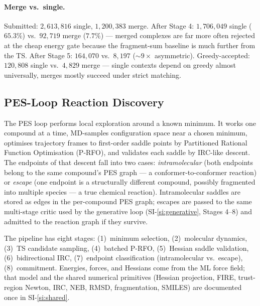 \paragraph{Merge vs.\ single.}
Submitted: $2{,}613{,}816$ single, $1{,}200{,}383$ merge. After Stage 4: $1{,}706{,}049$ single ($65.3\%$) vs.\ $92{,}719$ merge ($7.7\%$) --- merged complexes are far more often rejected at the cheap energy gate because the fragment-sum baseline is much further from the TS. After Stage 5: $164{,}070$ vs.\ $8{,}197$ ($\sim 9\times$ asymmetric). Greedy-accepted: $120{,}808$ single vs.\ $4{,}829$ merge --- single contexts depend on greedy almost universally, merges mostly succeed under strict matching.


%

\subsection{PES-Loop Reaction Discovery}
\label{si:pes}

The PES loop performs local exploration around a known minimum. It works one compound at a time, MD-samples configuration space near a chosen minimum, optimises trajectory frames to first-order saddle points by Partitioned Rational Function Optimisation (P-RFO), and validates each saddle by IRC-like descent. The endpoints of that descent fall into two cases: \emph{intramolecular} (both endpoints belong to the same compound's PES graph --- a conformer-to-conformer reaction) or \emph{escape} (one endpoint is a structurally different compound, possibly fragmented into multiple species --- a true chemical reaction). Intramolecular saddles are stored as edges in the per-compound PES graph; escapes are passed to the same multi-stage critic used by the generative loop (SI-\ref{si:generative}, Stages 4--8) and admitted to the reaction graph if they survive.

The pipeline has eight stages: (1)~minimum selection, (2)~molecular dynamics, (3)~TS candidate sampling, (4)~batched P-RFO, (5)~Hessian saddle validation, (6)~bidirectional IRC, (7)~endpoint classification (intramolecular vs.\ escape), (8)~commitment. Energies, forces, and Hessians come from the ML force field; that model and the shared numerical primitives (Hessian projection, FIRE, trust-region Newton, IRC, NEB, RMSD, fragmentation, SMILES) are documented once in SI-\ref{si:shared}.


